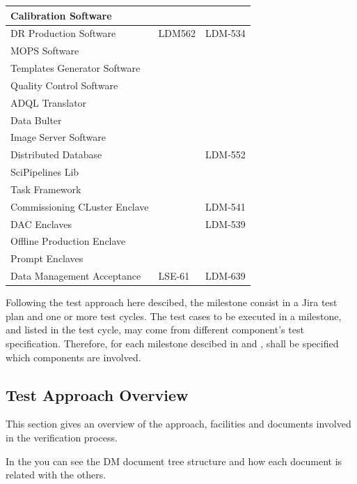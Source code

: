{\begin{longtable}[]{p{5cm}|p{2cm}|p{2cm}}
Calibration Software & & \\\hline
DR Production Software &\cellcolor{ballblue} LDM562 & \cellcolor{ballblue} LDM-534 \\\hline
MOPS Software & & \\\hline
Templates Generator Software & & \\\hline
Quality Control Software & & \\\hline
ADQL Translator & & \\\hline
Data Bulter & & \\\hline
Image Server Software & & \\\hline
Distributed Database & & \cellcolor{ballblue} LDM-552 \\\hline
SciPipelines Lib & & \\\hline
Task Framework & & \\\hline
Commissioning CLuster Enclave & & \cellcolor{pastelyellow} LDM-541 \\\hline
DAC Enclaves & & \cellcolor{pastelyellow} LDM-539 \\\hline
Offline Production Enclave & & \\\hline
Prompt Enclaves & & \\\hline
Data Management Acceptance & \cellcolor{ballblue} LSE-61 & \cellcolor{pastelorange} LDM-639 \\\hline
\end{longtable}
}

Following the test approach here descibed, the milestone consist in a Jira test plan and one or more test cycles.
The test cases to be executed in a milestone, and listed in the test cycle, may come from different component's test specification.
Therefore, for each milestone descibed in  and , shall be specified which components are involved.

\subsection{Test Approach Overview}\label{sect:tsform}

This section gives an overview of the approach, facilities and documents involved in the verification process.

In the  you can see the DM document tree structure and how each document is related with the others.


